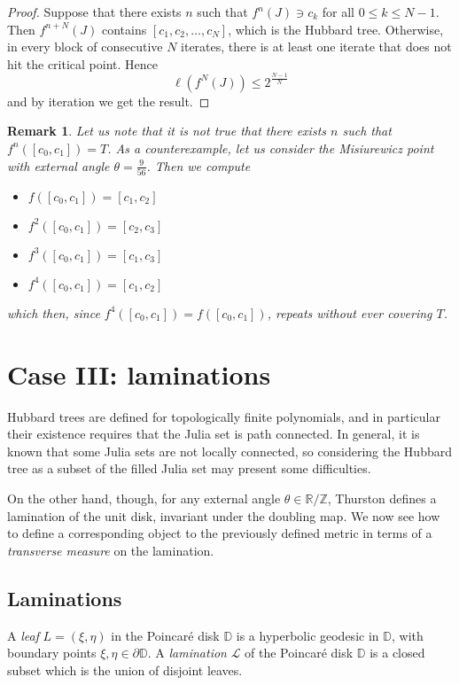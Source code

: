 \documentclass[11pt]{amsart}
\newtheorem{remark}[theorem]{Remark}
\begin{document}
\begin{proof}
Suppose that there exists $n$ such that $f^n(J) \ni c_k$ for all $0 \leq k \leq N-1$. 
Then $f^{n+N}(J)$ contains $[c_1, c_2, \dots, c_N]$, which is the Hubbard tree. 
Otherwise, in every block of consecutive $N$ iterates, there is at least one iterate 
that does not hit the critical point. 
Hence 
$$\ell(f^N(J)) \leq 2^{\frac{N-1}{N}}$$
and by iteration we get the result. 
\end{proof}

\begin{remark}
Let us note that it is not true that there exists $n$ such that $f^n([c_0, c_1]) = T$. 
As a counterexample, let us consider the Misiurewicz point with external angle $\theta = \frac{9}{56}$. 
Then we compute 
\begin{itemize}
\item $f([c_0, c_1]) = [c_1, c_2]$
\item $f^2([c_0, c_1]) = [c_2, c_3]$
\item $f^3([c_0, c_1]) = [c_1, c_3]$
\item $f^4([c_0, c_1]) = [c_1, c_2]$
\end{itemize}
which then, since $f^4([c_0, c_1]) = f([c_0, c_1])$, repeats without ever covering $T$.
\end{remark}

\section{Case III: laminations}

Hubbard trees are defined for topologically finite polynomials, and in particular their existence requires 
that the Julia set is path connected. In general, it is known that some Julia sets are not locally connected, 
so considering the Hubbard tree as a subset of the filled Julia set may present some difficulties. 

On the other hand, though, for any external angle $\theta \in \mathbb{R}/\mathbb{Z}$, Thurston defines a lamination of the unit disk, 
invariant under the doubling map. We now see how to define a corresponding object to the previously defined 
metric in terms of a \emph{transverse measure} on the lamination. 

\medskip
\subsection*{Laminations}
A \emph{leaf} $L = (\xi, \eta)$ in the Poincar\'e disk $\mathbb{D}$ is a hyperbolic geodesic in $\mathbb{D}$, 
with boundary points $\xi, \eta \in \partial \mathbb{D}$.
A \emph{lamination} $\mathcal{L}$ of the Poincar\'e disk $\mathbb{D}$ is a closed subset which is the union of disjoint leaves.
\end{document}
